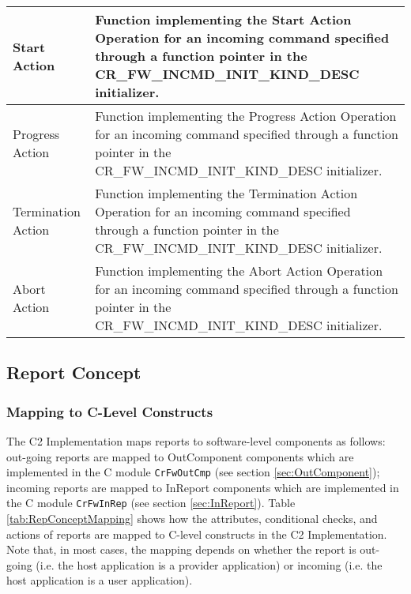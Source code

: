\documentclass{pnp_article}
\begin{document}
\begin{longtable}{|>{\raggedright}p{2.0cm}|p{11.3cm}|}
\hline
Start Action & Function implementing the Start Action Operation for an incoming command specified through a function pointer in the CR\_FW\_INCMD\_INIT\_KIND\_DESC initializer. \\
\hline
Progress Action & Function implementing the Progress Action Operation for an incoming command specified through a function pointer in the CR\_FW\_INCMD\_INIT\_KIND\_DESC initializer. \\
\hline
Termination Action & Function implementing the Termination Action Operation for an incoming command specified through a function pointer in the CR\_FW\_INCMD\_INIT\_KIND\_DESC initializer. \\
\hline
Abort Action & Function implementing the Abort Action Operation for an incoming command specified through a function pointer in the CR\_FW\_INCMD\_INIT\_KIND\_DESC initializer. \\
\hline
\end{longtable}


\subsection{Report Concept }\label{sec:RepConcept}


\subsubsection{Mapping to C-Level Constructs}\label{sec:RepConceptMapping}
The C2 Implementation maps reports to software-level components as follows: out-going reports are mapped to OutComponent components which are implemented in the C module \texttt{CrFwOutCmp} (see section \ref{sec:OutComponent}); incoming reports are mapped to InReport components which are implemented in the C module \texttt{CrFwInRep} (see section \ref{sec:InReport}). Table \ref{tab:RepConceptMapping} shows how the attributes, conditional checks, and actions of reports are mapped to C-level constructs in the C2 Implementation. Note that, in most cases, the mapping depends on whether the report is out-going (i.e. the host application is a provider application) or incoming (i.e. the host application is a user application).
\end{document}
